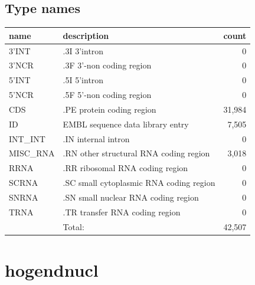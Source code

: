 \documentclass{article}
\begin{document}
\begin{Schunk}
\subsection{Type names}
\noindent\begin{tabular}{llr}
\hline \hline
name & description & count \\
\hline
3'INT  &  .3I 3'intron  &  0 \\
3'NCR  &  .3F  3'-non coding region  &  0 \\
5'INT  &  .5I 5'intron  &  0 \\
5'NCR  &  .5F  5'-non coding region  &  0 \\
CDS  &  .PE protein coding region  &  31,984 \\
ID  &  EMBL sequence data library entry  &  7,505 \\
INT\_INT  &  .IN  internal intron  &  0 \\
MISC\_RNA  &  .RN other structural RNA coding region  &  3,018 \\
RRNA  &  .RR ribosomal RNA coding region  &  0 \\
SCRNA  &  .SC small cytoplasmic RNA coding region  &  0 \\
SNRNA  &  .SN small nuclear RNA coding region  &  0 \\
TRNA  &  .TR transfer RNA coding region  &  0 \\
\hline
 & Total: & 42,507 \\
\hline \hline
\end{tabular}

\section{ hogendnucl }

\end{Schunk}
\end{document}
